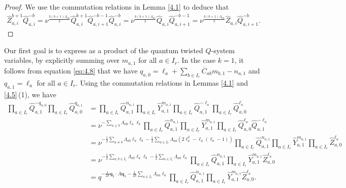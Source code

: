 \documentclass[10pt,a4paper]{amsart}
\numberwithin{equation}{section}
\begin{document}
\begin{proof}
We use the commutation relations in Lemma \ref{4.1} to deduce that
\begin{gather*}
\widehat{Z}_{a,i}^{b+1}\widehat{Q}_{a,i}^{-b}
=\nu^{\frac{b(b+1)\Lambda_{aa}}{2}}\widehat{Q}_{a,i}^{b+1}\widehat{Q}_{a,i+1}^{-b-1}\widehat{Q}_{a,i}^{-b}
=\nu^{\frac{b(b+1)\Lambda_{aa}}{2}}\widehat{Q}_{a,i}\widehat{Q}_{a,i+1}^{-b-1}
=\nu^{\frac{b(b+1)\Lambda_{aa}}{2}}\widehat{Z}_{a,i}\widehat{Q}_{a,i+1}^{-b}.\tag*{\qed}
\end{gather*}\renewcommand{\qed}{}
\end{proof}

Our first goal is to express  as a product of the quantum twisted $Q$-system variables, by explicitly summing over $m_{a,1}$ for all $a\in I_r$. In the case $k=1$, it follows from equation \eqref{eq:4.8} that we have $q_{a,0}=\ell_a+\sum_{b\in I_r}\overline{C}_{ab}m_{b,1}-n_{a,1}$ and $q_{a,1}=\ell_a$ for all $a\in I_r$. Using the commutation relations in Lemmas \ref{4.1} and \ref{4.5}\,(1), we have
\begin{align*}
\prod_{a\in I_r}\widehat{Q}_{a,1}^{-q_{a,0}}\prod_{a\in I_r}\widehat{Q}_{a,0}^{q_{a,1}}
&=\prod_{a\in I_r}\widehat{Q}_{a,1}^{n_{a,1}}\prod_{a\in I_r}\widehat{Y}_{a,1}^{m_{a,1}}\prod_{a\in I_r}\widehat{Q}_{a,1}^{-\ell_a}\prod_{a\in I_r}\widehat{Q}_{a,0}^{\ell_a}\\
&=\nu^{-\sum_{a\leq b}\Lambda_{ab}\ell_a\ell_b}\prod_{a\in I_r}\widehat{Q}_{a,1}^{n_{a,1}}\prod_{a\in I_r}\widehat{Y}_{a,1}^{m_{a,1}}\prod_{a\in I_r}\widehat{Q}_{a,0}^{\ell_a}\widehat{Q}_{a,1}^{-\ell_a}\\
&=\nu^{-\frac{1}{2}\sum_{a\neq b}\Lambda_{ab}\ell_a\ell_b-\frac{1}{2}\sum_{a\in I_r}\Lambda_{aa}(2\ell_a^2-\ell_a(\ell_a-1))}\prod_{a\in I_r}\widehat{Q}_{a,1}^{n_{a,1}}\prod_{a\in I_r}\widehat{Y}_{a,1}^{m_{a,1}}\prod_{a\in I_r}\widehat{Z}_{a,0}^{\ell_a}\\
&=\nu^{-\frac{1}{2}\sum_{a,b\in I_r}\Lambda_{ab}\ell_a\ell_b-\frac{1}{2}\sum_{a\in I_r}\Lambda_{aa}\ell_a}\prod_{a\in I_r}\widehat{Q}_{a,1}^{n_{a,1}}\prod_{a\in I_r}\widehat{Y}_{a,1}^{m_{a,1}}\widehat{Z}_{a,0}^{\ell_a}\\
&=q^{-\frac{1}{2\delta}\mathbf{q}_1\cdot\Lambda\mathbf{q}_1-\frac{1}{2\delta}\sum_{a\in I_r}\Lambda_{aa}\ell_a}\prod_{a\in I_r}\widehat{Q}_{a,1}^{n_{a,1}}\prod_{a\in I_r}\widehat{Y}_{a,1}^{m_{a,1}}\widehat{Z}_{a,0}^{\ell_a}.
\end{align*}
\end{document}

